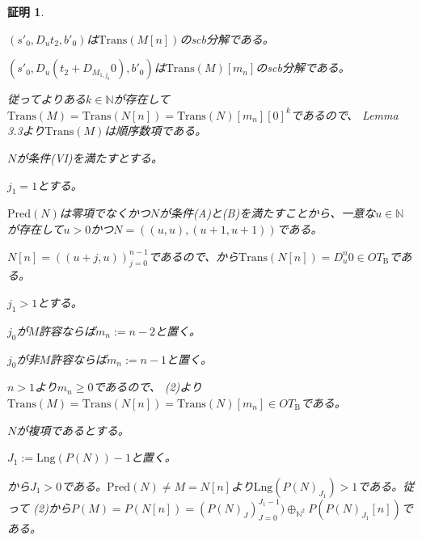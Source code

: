 \documentclass[dvipdfmx,uplatex]{jsarticle}
\theoremstyle{customnonumberbreakfortheorem}
\theoremstyle{customnonumberbreakforproof}
\newtheorem{hideableproof}{証明}
\begin{document}
\begin{hideableproof}
\begin{indented}
\begin{indented}
\begin{indented}
\begin{indented}
					\begin{penumerate}
						\item \((s'_0,D_u t_2,b'_0)\)は\(\textrm{Trans}(M[n])\)のscb分解である。
						\item \((s'_0,D_u(t_2 + D_{M_{1,j_0}} 0),b'_0)\)は\(\textrm{Trans}(M)[m_n]\)のscb分解である。
					\end{penumerate}
					\item 従ってよりある\(k \in \mathbb{N}\)が存在して\(\textrm{Trans}(M)  = \textrm{Trans}(N[n]) = \textrm{Trans}(N)[m_n][0]^k\)であるので、\cite{buc1} Lemma 3.3より\(\textrm{Trans}(M)\)は順序数項である。
				\end{indented}
				\item
				\item \(N\)が条件(VI)を満たすとする。
				\begin{indented}
					\item \(j_1 = 1\)とする。
					\begin{indented}
						\item \(\textrm{Pred}(N)\)は零項でなくかつ\(N\)が条件(A)と(B)を満たすことから、一意な\(u \in \mathbb{N}\)が存在して\(u > 0\)かつ\(N = ((u,u),(u+1,u+1))\)である。
						\item \(N[n] = ((u+j,u))_{j=0}^{n-1}\)であるので、から\(\textrm{Trans}(N[n]) = D_u^n 0 \in OT_{\textrm{B}}\)である。
					\end{indented}
					\item \(j_1 > 1\)とする。
					\item \(j_0\)が\(M\)許容ならば\(m_n := n-2\)と置く。
					\item \(j_0\)が非\(M\)許容ならば\(m_n := n-1\)と置く。
					\item \(n > 1\)より\(m_n \geq 0\)であるので、 (2)より\(\textrm{Trans}(M) = \textrm{Trans}(N[n]) = \textrm{Trans}(N)[m_n] \in OT_{\textrm{B}}\)である。
				\end{indented}
			\end{indented}
			\item
			\item \(N\)が複項であるとする。
			\begin{indented}
				\item \(J_1 := \textrm{Lng}(P(N))-1\)と置く。
				\item {}から\(J_1 > 0\)である。\(\textrm{Pred}(N) \neq M = N[n]\)より\(\textrm{Lng}(P(N)_{J_1}) > 1\)である。従って (2)から\(P(M) = P(N[n]) = (P(N)_J)_{J=0}^{J_1-1}) \oplus_{\mathbb{N}^2} P(P(N)_{J_1}[n])\)である。

\end{indented}
\end{indented}
\end{indented}
\end{hideableproof}
\end{document}
